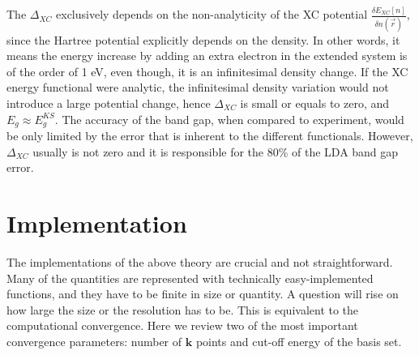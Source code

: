 The $\Delta_{XC}$ exclusively depends on the non-analyticity of the XC potential $\frac{\delta E_{XC}[n]}{\delta n(\vec{r})}$, since the Hartree potential explicitly depends on the density. In other words, it means the energy increase by adding an extra electron in the extended system is of the order of 1 eV, even though, it is an infinitesimal density change. If the XC energy functional were analytic, the infinitesimal density variation would not introduce a large potential change, hence $\Delta_{XC}$ is small or equals to zero, and $E_g \approx E^{KS}_g$. The accuracy of the band gap, when compared to experiment, would be only limited by the error that is inherent to the different functionals. However, $\Delta_{XC}$ usually is not zero and it is responsible for the 80\% of the LDA band gap error\cite{Godby1988}. 
\section{Implementation}
The implementations of the above theory are crucial and not straightforward. Many of the quantities are represented with technically easy-implemented functions, and they have to be finite in size or quantity. A question will rise on how large the size or the resolution has to be. This is equivalent to the computational convergence. Here we review two of the most important convergence parameters: number of $\mathbf{k}$ points and cut-off energy of the basis set.
